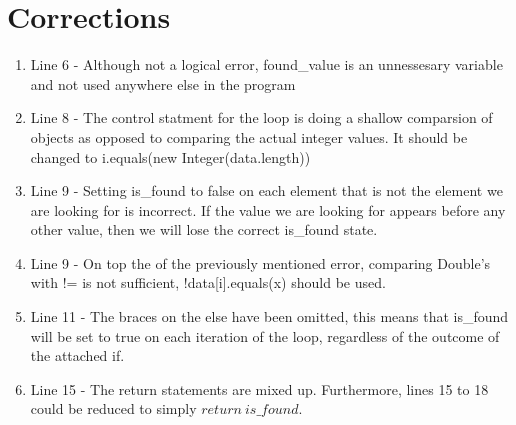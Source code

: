 \documentclass[12pt]{article}
\begin{document}
\maketitle

\section{Corrections}

\begin{enumerate}
    \item Line 6 - Although not a logical error, found\_value is an unnessesary 
        variable and not used anywhere else in the program
    \item Line 8 - The control statment for the loop is doing a shallow comparsion 
        of objects as opposed to comparing the actual integer values.  It should be 
        changed to i.equals(new Integer(data.length))
    \item Line 9 - Setting is\_found to false on each element that is not the element 
        we are looking for is incorrect.  If the value we are looking for appears 
        before any other value, then we will lose the correct is\_found state.
    \item Line 9 - On top the of the previously mentioned error, comparing Double's 
        with != is not sufficient, !data[i].equals(x) should be used.
    \item Line 11 - The braces on the else have been omitted, this means that 
        is\_found will be set to true on each iteration of the loop, regardless of 
        the outcome of the attached if.
    \item Line 15 - The return statements are mixed up.  Furthermore, lines 15 to 18 
        could be reduced to simply $return\ is\_found$.
\end{enumerate}
\end{document}
